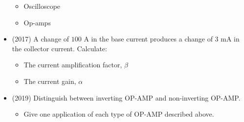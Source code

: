 \documentclass{article}
\begin{document}
\begin{itemize}
\begin{itemize}
\item Oscilloscope
\item Op-amps
\end{itemize}
\item (2017)  A change of $ 100$ A in the base current produces a change of $ 3$ mA in the collector current. Calculate:\begin{itemize}
\item The current amplification factor, $ \beta$
\item The current gain, $ \alpha $
\end{itemize}
\item (2019)  Distinguish between inverting OP-AMP and non-inverting OP-AMP. \begin{itemize}
\item Give one application of each type of OP-AMP described above.
\end{itemize}
\end{itemize}
\end{document}
